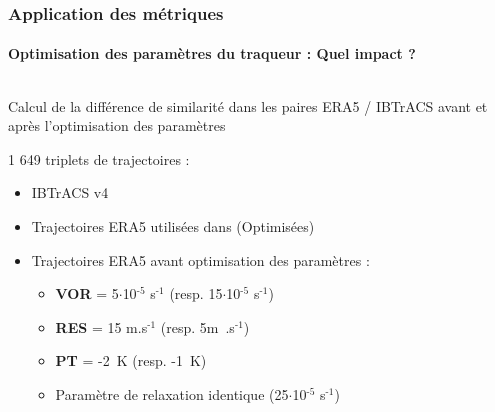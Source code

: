 \documentclass[aspectratio=169, usepdftitle=false, xcolor={dvipsnames}, 9pt,table]{beamer}
\begin{document}
\begin{frame}[c]
    \frametitle{Application des métriques}
    \framesubtitle{Optimisation des paramètres du traqueur : Quel impact ?}
    \begin{columns}
        \begin{column}{0.6\textwidth}
           \footnotesize
           \begin{definition}
               \centering
               Calcul de la différence de similarité dans les paires ERA5 / IBTrACS avant et après l'optimisation des paramètres
           \end{definition}
           \vspace{1em}
           \begin{block}
               1 649 \alert{triplets} de trajectoires :
               \begin{itemize}
                    \item IBTrACS v4
                    \item Trajectoires ERA5 utilisées dans \cite{dulac_assessing_2023} (Optimisées)
                    \item Trajectoires ERA5 \alert{avant} optimisation des paramètres :
                        \begin{itemize}
                            \footnotesize
                            \item \textbf{VOR} = 5$\cdot$10$^{\text{-5}}$ s$^{\text{-1}}$ (resp. 15$\cdot$10$^{\text{-5}}$ s$^{\text{-1}}$)
                            \item \textbf{RES} = 15 m.s$^{\text{-1}}$ (resp. 5m~.s$^{\text{-1}}$)
                            \item \textbf{PT} = -2~K (resp. -1~K)
                            \item Paramètre de relaxation \alert{identique} (25$\cdot$10$^{\text{-5}}$ s$^{\text{-1}}$)

\end{itemize}
\end{itemize}
\end{block}
\end{column}
\end{columns}
\end{frame}
\end{document}
